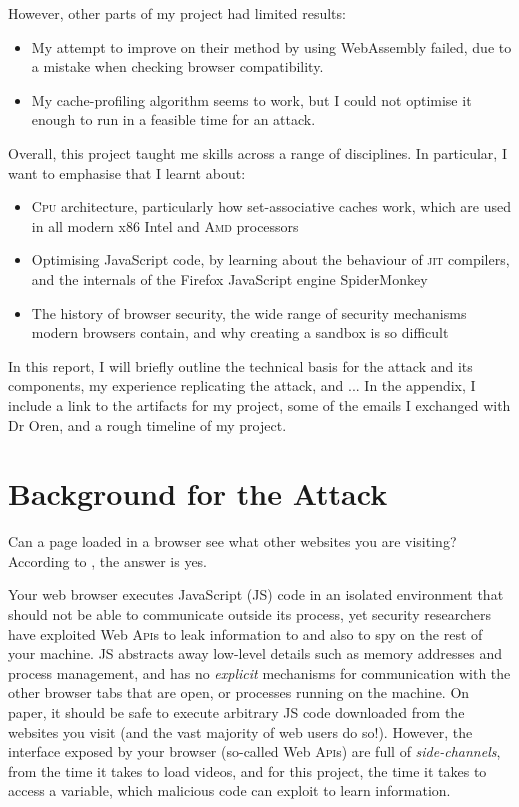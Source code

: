 \documentclass[a4paper,10pt,twocolumn]{article}
\theoremstyle{definition}
\newcommand*{\acronym}{\textsc}
\newcommand*{\API}{\acronym{Api}}
\begin{document}
However, other parts of my project had limited results:
\begin{itemize}[nosep]
\item My attempt to improve on their method by using WebAssembly failed, due to
  a mistake when checking browser compatibility.
\item My cache-profiling algorithm seems to work, but I could not optimise it
  enough to run in a feasible time for an attack.
\end{itemize}

Overall, this project taught me skills across a range of disciplines.
In particular, I want to emphasise that I learnt about:
\begin{itemize}[nosep]
  \item \acronym{Cpu} architecture, particularly how set-associative caches
work, which are used in all modern x86 Intel and \acronym{Amd} processors
  \item Optimising JavaScript code, by learning about the behaviour of
    \acronym{jit} compilers, and the internals of the Firefox JavaScript engine
    SpiderMonkey
  \item The history of browser security, the wide range of security mechanisms
    modern browsers contain, and why creating a sandbox is so difficult
\end{itemize}

In this report, I will briefly outline the technical basis for the attack and
its components, my experience replicating the attack, and ...
In the appendix, I include a link to the artifacts for my project, some of the
emails I exchanged with Dr Oren, and a rough timeline of my project.

\section{Background for the Attack}

Can a page loaded in a browser see what other websites you are visiting?
According to \textcite{Oren_KSK_2015}, the answer is yes.

Your web browser executes JavaScript (JS) code in an isolated environment that should
not be able to communicate outside its process, yet security researchers have
exploited Web \API{}s to leak information to and also to spy on the rest of your
machine.
JS abstracts away low-level details such as memory addresses and process
management, and has no \emph{explicit} mechanisms for communication with the
other browser tabs that are open, or processes running on the machine.
On paper, it should be safe to execute arbitrary JS code downloaded from
the websites you visit (and the vast majority of web users do so!).
However, the interface exposed by your browser (so-called Web \API{}s) are full
of \emph{side-channels}, from the time it takes to load videos, and for this
project, the time it takes to access a variable, which malicious code can
exploit to learn information.
\end{document}
